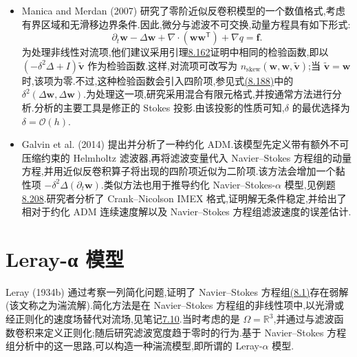 \begin{note}
\label{note:les-adm-fem-error-analysis}
\begin{itemize}
 \item Manica and Merdan (2007) 研究了零阶近似反卷积模型的一个数值格式,考虑有界区域和无滑移边界条件.因此,微分与滤波不可交换,动量方程具有如下形式:
 \[
  \partial_t\bm{w}-\Delta\bm{w}
  +\nabla\cdot(\bm{w}\bm{w}^{\mathsf T})
  +\nabla q=\bm{f}.
 \]
 为处理非线性对流项,他们建议采用引理\hyperref[lem:les-adm-zero-order-stability]{8.162}证明中相同的检验函数,即以
 $(-\delta^2\Delta+I)\widetilde{\bm{v}}$ 作为检验函数.这样,对流项可改写为
 $n_{\mathrm{skew}}(\bm{w},\bm{w},\widetilde{\bm{v}})$;当
 $\widetilde{\bm{v}}=\bm{w}$ 时,该项为零.不过,这种检验函数会引入四阶项,参见式\hyperref[eq:les-adm-zero-order-energy-intermediate]{(8.188)}中的
 $\delta^2(\Delta\bm{w},\Delta\bm{w})$.为处理这一项,研究采用混合有限元格式,并按通常方法进行分析.分析的主要工具是修正的 Stokes 投影.由该投影的性质可知,$\delta$ 的最优选择为 $\delta=\mathcal{O}(h)$.
 \item Galvin et al. (2014) 提出并分析了一种约化 ADM.该模型先定义带有额外不可压缩约束的 Helmholtz 滤波器,再将滤波变量代入 Navier--Stokes 方程组的动量方程,并用近似反卷积算子将出现的四阶项近似为二阶项.该方法会增加一个黏性项 $-\delta^2\Delta(\partial_t\bm{w})$.类似方法也用于推导约化 Navier--Stokes-$\alpha$ 模型,见例题\hyperref[ex:navier-stokes-alpha-channel-flow]{8.208}.研究者分析了 Crank--Nicolson IMEX 格式,证明解无条件稳定,并给出了相对于约化 ADM 连续速度解以及 Navier--Stokes 方程组滤波速度的误差估计.
\end{itemize}
\end{note}

\section{Leray-α 模型}
\label{sec:leray-alpha-model}\label{sec:les-differential-filter-discretization}

\begin{note}[动机]
\label{note:leray-alpha-motivation}
Leray (1934b) 通过考察一列简化问题,证明了 Navier--Stokes 方程组\hyperref[eq:turbulent-navier-stokes]{(8.1)}存在弱解(该文称之为湍流解).简化方法是在 Navier--Stokes 方程组的非线性项中,以光滑或经正则化的速度场替代对流场,见笔记\hyperref[note:time-dependent-ns-simpler-problems]{7.10}.当时考虑的是 $\Omega=\mathbb{R}^3$,并通过与滤波函数卷积来定义正则化;随后研究滤波宽度趋于零时的行为.基于 Navier--Stokes 方程组分析中的这一思路,可以构造一种湍流模型,即所谓的 Leray-$\alpha$ 模型.
\end{note}

